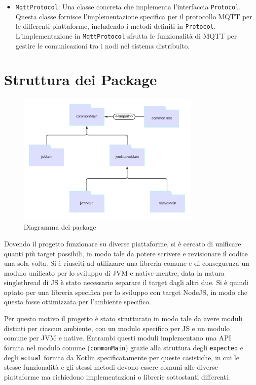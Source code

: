 \documentclass[12pt,a4paper,openright,twoside]{book}
\begin{document}
\begin{itemize}
    \item \texttt{MqttProtocol}: Una classe concreta che implementa l'interfaccia \texttt{Protocol}. Questa classe fornisce l'implementazione 
    specifica per il protocollo \ac{MQTT} per le differenti piattaforme, includendo i metodi definiti in \texttt{Protocol}.
    L'implementazione in \texttt{MqttProtocol} sfrutta le funzionalità di \ac{MQTT} per gestire le comunicazioni tra i nodi nel sistema distribuito.

\end{itemize}

\section{Struttura dei Package}
\begin{figure}[H]
    \centering
    \includegraphics[width=0.8\textwidth]{figures/package-diagram.png}
    \caption{Diagramma dei package}
    \label{fig:diagramma-package}
\end{figure}

Dovendo il progetto funzionare su diverse piattaforme, si è cercato di unificare quanti più target possibili, in modo tale da potere scrivere e revisionare il codice una sola volta.
Si è riusciti ad utilizzare una libreria comune e di conseguenza un modulo unificato per lo sviluppo di \ac{JVM} e native 
mentre, data la natura singlethread di \ac{JS} è stato necessario separare il target dagli altri due. Si è quindi optato per una libreria specifica 
per lo sviluppo con target NodeJS, in modo che questa fosse ottimizzata per l'ambiente specifico. 

Per questo motivo il progetto è stato strutturato in modo tale da avere moduli distinti per ciascun ambiente, con un modulo specifico per \ac{JS} 
e un modulo comune per \ac{JVM} e native. Entrambi questi moduli implementano una API fornita nel modulo comune (\texttt{commonMain}) grazie
alla struttura degli \texttt{expected} e degli \texttt{actual} fornita da Kotlin specificatamente per queste casistiche, in cui le stesse funzionalità
e gli stessi metodi devono essere comuni alle diverse piattaforme ma richiedono implementazioni o librerie sottostanti differenti.
\end{document}
